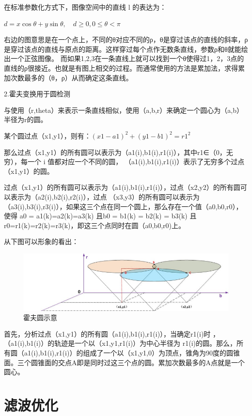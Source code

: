 在标准参数化方式下，图像空间中的直线 l 的表达为：

$d=x \cos \theta+y \sin \theta, \quad d \geqslant 0,0 \leqslant \theta<\pi$

右边的图意思是在一个点上，不同的θ对应不同的ρ，θ是穿过该点的直线的斜率，ρ是穿过该点的直线与原点的距离。这样穿过每个点作无数条直线，参数ρ和θ就能绘出一个正弦图像。 ⽽如果1,2,3在一条直线上就可以找到⼀个θ使得过1，2，3点的直线的ρ很接近。也就是有图上相交的过程。而通常使用的方法是累加法，求得累加次数最多的（θ，ρ）从⽽确定这条直线。

2.霍夫变换用于圆检测

与使用（r,theta）来表示一条直线相似，使用（a,b,r）来确定一个圆心为（a,b）半径为r的圆。

某个圆过点（x1,y1），则有：$(x1-a1)^2 + (y1-b1)^2 = r1^2$

那么过点（x1,y1）的所有圆可以表示为（a1(i),b1(i),r1(i)），其中r1∈（0，无穷），每⼀个 i 值都对应⼀个不同的圆， （a1(i),b1(i),r1(i)）表⽰了无穷多个过点（x1,y1）的圆。

过点（x1,y1）的所有圆可以表示为（a1(i),b1(i),r1(i)），过点（x2,y2）的所有圆可以表示为（a2(i),b2(i),r2(i)），过点 （x3,y3）的所有圆可以表⽰为（a3(i),b3(i),r3(i)），如果这三个点在同一个圆上，那么存在一个值（a0,b0,r0），使得 a0 = a1(k)=a2(k)=a3(k) 且b0 = b1(k) = b2(k) = b3(k) 且r0=r1(k)=r2(k)=r3(k)，即这三个点同时在圆（a0,b0,r0)上。

从下图可以形象的看出：

\begin{figure}[ht]
  \centering
  \includegraphics[width=0.8\linewidth]{./Figure/Hough_Circle.png}
  \caption{霍夫圆示意}\label{Fig:xd1}
\end{figure}

⾸先，分析过点（x1,y1）的所有圆（a1(i),b1(i),r1(i)），当确定r1(i)时 ，（a1(i),b1(i)）的轨迹是⼀个以（x1,y1,r1(i)）为中心半径为 r1(i)的圆。那么，所有圆（a1(i),b1(i),r1(i)）的组成了一个以（x1,y1,0）为顶点，锥角为90度的圆锥面。三个圆锥面的交点A即是同时过这三个点的圆。累加次数最多的A点就是一个圆⼼。

\section{滤波优化}

